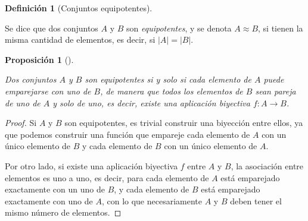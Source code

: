 \documentclass[
  a4paper,
]{scrreport}
\theoremstyle{definition}
\newtheorem{definition}{Definición}[chapter]
\theoremstyle{plain}
\theoremstyle{plain}
\newtheorem{proposition}{Proposición}[chapter]
\theoremstyle{definition}
\theoremstyle{definition}
\theoremstyle{plain}
\theoremstyle{remark}
\begin{document}
\begin{definition}[Conjuntos
equipotentes]\protect\hypertarget{def-conjuntos-equipotentes}{}\label{def-conjuntos-equipotentes}

Se dice que dos conjuntos \(A\) y \(B\) son \emph{equipotentes}, y se
denota \(A\approx B\), si tienen la misma cantidad de elementos, es
decir, si \(|A| = |B|\).

\end{definition}

\begin{proposition}[]\protect\hypertarget{prp-biyeccion-conjuntos-equipotentes}{}\label{prp-biyeccion-conjuntos-equipotentes}

Dos conjuntos \(A\) y \(B\) son equipotentes si y solo si cada elemento
de \(A\) puede emparejarse con uno de \(B\), de manera que todos los
elementos de \(B\) sean pareja de uno de \(A\) y solo de uno, es decir,
existe una aplicación biyectiva \(f:A\rightarrow B\).

\end{proposition}

\begin{tcolorbox}[enhanced jigsaw, breakable, title=\textcolor{quarto-callout-note-color}{\faInfo}\hspace{0.5em}{Demostración}, toprule=.15mm, coltitle=black, arc=.35mm, rightrule=.15mm, colframe=quarto-callout-note-color-frame, colbacktitle=quarto-callout-note-color!10!white, toptitle=1mm, titlerule=0mm, leftrule=.75mm, opacityback=0, colback=white, bottomrule=.15mm, bottomtitle=1mm, left=2mm, opacitybacktitle=0.6]

\begin{proof}

Si \(A\) y \(B\) son equipotentes, es trivial construir una biyección
entre ellos, ya que podemos construir una función que empareje cada
elemento de \(A\) con un único elemento de \(B\) y cada elemento de
\(B\) con un único elemento de \(A\).

Por otro lado, si existe una aplicación biyectiva \(f\) entre \(A\) y
\(B\), la asociación entre elementos es uno a uno, es decir, para cada
elemento de \(A\) está emparejado exactamente con un uno de \(B\), y
cada elemento de \(B\) está emparejado exactamente con uno de \(A\), con
lo que necesariamente \(A\) y \(B\) deben tener el mismo número de
elementos.

\end{proof}

\end{tcolorbox}
\end{document}
